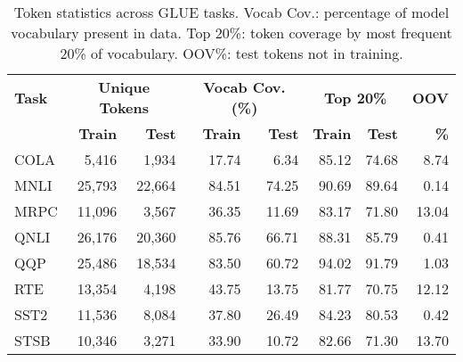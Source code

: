 \begin{table}[htbp]
\centering
\scriptsize
\setlength{\tabcolsep}{3pt}
\begin{tabular}{l|rr|rr|rr|r}
\toprule
\textbf{Task} & \multicolumn{2}{c|}{\textbf{Unique Tokens}} & \multicolumn{2}{c|}{\textbf{Vocab Cov. (\%)}} & \multicolumn{2}{c|}{\textbf{Top 20\%}} & \textbf{OOV} \\
    & \textbf{Train} & \textbf{Test} & \textbf{Train} & \textbf{Test} & \textbf{Train} & \textbf{Test} & \textbf{\%} \\
\midrule
COLA & 5,416 & 1,934 & 17.74 & 6.34 & 85.12 & 74.68 & 8.74 \\
MNLI & 25,793 & 22,664 & 84.51 & 74.25 & 90.69 & 89.64 & 0.14 \\
MRPC & 11,096 & 3,567 & 36.35 & 11.69 & 83.17 & 71.80 & 13.04 \\
QNLI & 26,176 & 20,360 & 85.76 & 66.71 & 88.31 & 85.79 & 0.41 \\
QQP & 25,486 & 18,534 & 83.50 & 60.72 & 94.02 & 91.79 & 1.03 \\
RTE & 13,354 & 4,198 & 43.75 & 13.75 & 81.77 & 70.75 & 12.12 \\
SST2 & 11,536 & 8,084 & 37.80 & 26.49 & 84.23 & 80.53 & 0.42 \\
STSB & 10,346 & 3,271 & 33.90 & 10.72 & 82.66 & 71.30 & 13.70 \\
\bottomrule
\end{tabular}
\caption{Token statistics across GLUE tasks. Vocab Cov.: percentage of model vocabulary present in data. Top 20\%: token coverage by most frequent 20\% of vocabulary. OOV\%: test tokens not in training.}

\label{tab:token_statistics}
\end{table}
